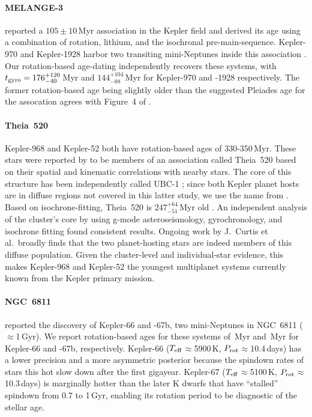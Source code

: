 \documentclass[11pt,twocolumn,tighten]{aastex63}
\begin{document}
\paragraph{MELANGE-3}
\citet{2022AJ....164...88B} reported a $105\pm10$\,Myr association in
the Kepler field and derived its age using a combination of rotation,
lithium, and the isochronal pre-main-sequence.  Kepler-970 and
Kepler-1928 harbor two transiting mini-Neptunes inside this
association \citep{2022AJ....164...88B}.  Our rotation-based
age-dating independently recovers these systems, with $t_{\rm
gyro}=176_{-40}^{+120}$\,Myr and $144_{-88}^{+104}$\,Myr for
Kepler-970 and -1928 respectively.  The former rotation-based age
being slightly older than the suggested Pleiades age for the
assocation agrees with Figure~4 of \citet{2022AJ....164...88B}.

\paragraph{Theia~520}
Kepler-968 and Kepler-52 both have rotation-based ages of
330-350\,Myr.  These stars were reported by
\citet{2019AJ....158..122K} to be members of an association called Theia~520
based on their spatial and kinematic correlations with nearby stars.
The core of this structure has been independently called UBC-1
\citep{2018A&A...618A..59C}; since both Kepler planet hosts
are in diffuse regions not covered in this latter study, we use the name from
\citeauthor{2019AJ....158..122K}.  Based on isochrone-fitting, Theia~520
is $247^{+64}_{-51}$\,Myr old \citep{2019AJ....158..122K}.
An independent analysis of the cluster's core by
\citet{2024A&A...681A..13F} using g-mode asteroseismology,
gyrochronology, and isochrone fitting found consistent results.
Ongoing work by J.~Curtis et al.~broadly finds that the two
planet-hosting stars are indeed members of this diffuse population.
Given the cluster-level and individual-star evidence, this makes
Kepler-968 and Kepler-52 the youngest multiplanet systems currently
known from the Kepler primary mission.

\paragraph{NGC~6811}
\citet{Meibom_2013} reported the discovery of Kepler-66 and -67b, two
mini-Neptunes in NGC~6811 ($\approx$1\,Gyr).  We report rotation-based
ages for these systems of \kepsixsixtgyro\,Myr and \kepsixseventgyro\,Myr for
Kepler-66 and -67b, respectively.  Kepler-66 ($T_{\rm
eff}$$\approx$5900\,K, $P_{\rm rot}$$\approx$10.4\,days) has a lower
precision and a more asymmetric posterior because the spindown rates
of stars this hot slow down after the first gigayear.
Kepler-67 ($T_{\rm eff}$$\approx$5100\,K, $P_{\rm
rot}$$\approx$10.3\,days) is marginally hotter than the later K dwarfs
that have ``stalled'' spindown from 0.7 to 1\,Gyr, enabling its
rotation period to be diagnostic of the stellar age.
\end{document}
